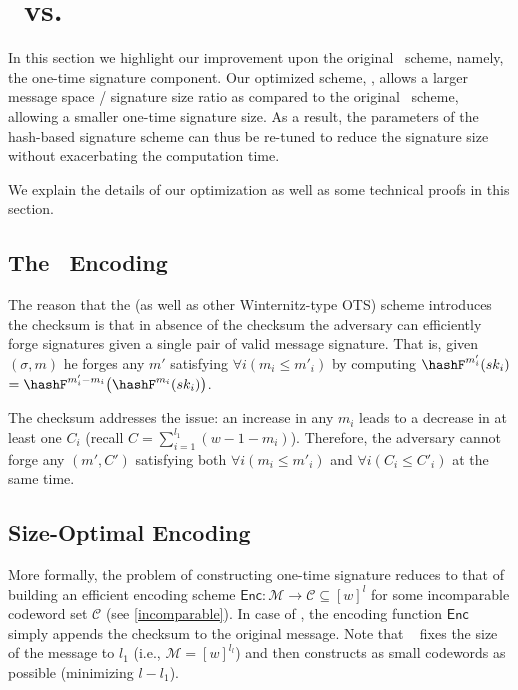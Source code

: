 \section{\SPHINCSA\ vs. \SPHINCSP} \label{sec:balanced wotsp}

In this section we highlight our improvement upon the original \SPHINCSP\ scheme, namely, the one-time signature component.
Our optimized scheme, \WOTSCS, allows a larger message space / signature size ratio as compared to the original \WOTSP\ scheme, allowing a smaller one-time signature size. As a result, the parameters of the hash-based signature scheme can thus be re-tuned to reduce the signature size without exacerbating the computation time.

We explain the details of our optimization as well as some technical proofs in this section.

\subsection{The \WOTSP~Encoding}

The reason that the \WOTSP (as well as other Winternitz-type OTS) scheme introduces the checksum is that in absence of the checksum the adversary can efficiently forge signatures given a single pair of valid message signature. That is, given $(\sigma,m)$ he forges any $m'$ satisfying $\forall i(m_i\leq m'_i)$ by computing $\hashF^{m'_i}(sk_i)$ $=\hashF^{m'_i-m_i}\big( \hashF^{m_i}(sk_i)\big)$.

The checksum addresses the issue: an increase in any $m_i$ leads to a decrease in at least one $C_i$ (recall $C=\sum_{i=1}^{l_1}(w-1-m_i)$). Therefore, the adversary cannot forge any $(m',C')$ satisfying both $\forall i(m_i\leq m'_i)$ and $\forall i(C_i\leq C'_i)$ at the same time.






\subsection{Size-Optimal Encoding}

More formally, the problem of constructing one-time signature reduces to that of building an efficient encoding scheme $\mathsf{Enc}:\mathcal{M}\rightarrow \mathcal{C}\subseteq[w]^{l}$ for some incomparable codeword set $\mathcal{C}$ (see \cref{incomparable}). In case of \WOTSP, the encoding function $\mathsf{Enc}$ simply appends the checksum to the original message. Note that \WOTSP~ fixes the size of the message to $l_1$ (i.e., $\mathcal{M}=[w]^{l_l}$) and then constructs as small codewords as possible (minimizing $l-l_1$). 





